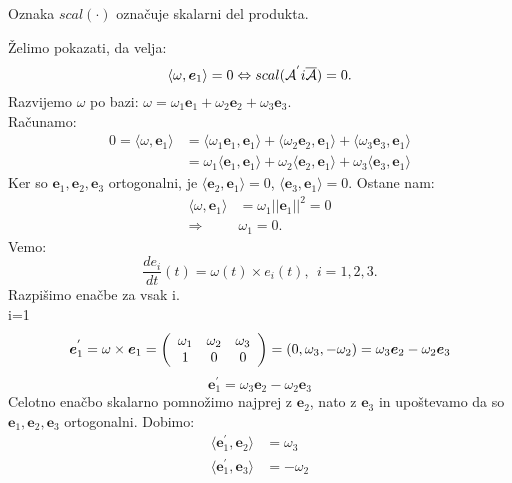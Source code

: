 \documentclass[mat1]{fmfdelo}
\newcommand{\e}{\boldsymbol e}
\newcommand{\A}{\mathcal A}
\begin{document}
\begin{opomba}
	Oznaka $scal(\cdot)$ označuje skalarni del produkta.
\end{opomba}
\begin{dokaz}
Želimo pokazati, da velja:
\begin{equation}
\langle \omega,\e_1\rangle = 0 \Leftrightarrow scal(\A^{'} \\i\overline{\A}) = 0.
\end{equation}
Razvijemo $\omega$ po bazi: $\omega = \omega_1\e_1+\omega_2\e_2+\omega_3\e_3$. \\
Računamo:
\begin{equation*}
\begin{split}
0 = \langle \omega, \e_1 \rangle &= \langle \omega_1\e_1,\e_1\rangle + \langle \omega_2\e_2,\e_1\rangle + \langle \omega_3\e_3,\e_1\rangle \\
&= \omega_1\langle \e_1,\e_1\rangle + \omega_2\langle \e_2,\e_1\rangle + \omega_3\langle \e_3,\e_1\rangle
\end{split}
\end{equation*}
Ker so $\e_1,\e_2,\e_3$ ortogonalni, je  $\langle \e_2,\e_1\rangle = 0$, $\langle \e_3,\e_1\rangle=0$.
Ostane nam:
\begin{equation*}
\begin{split}
\langle \omega,\e_1 \rangle &=\omega_1 || \e_1 ||^2 = 0 \\
\Rightarrow ~~ & \omega_1 = 0.
\end{split}
\end{equation*}
Vemo:
\begin{equation*}
\frac{de_i}{dt}(t) = \omega(t) \times e_i(t), ~~ i=1,2,3.
\end{equation*}
Razpišimo enačbe za vsak i.\\
i=1
\begin{equation*}
\e_1^{'} = \omega \times \e_1 = \left(
\begin{array}{c c c}
\omega_1 & \omega_2 & \omega_3 \\
1 & 0 & 0
\end{array} \right)
= (0, \omega_3,-\omega_2) = \omega_3\e_2 - \omega_2\e_3
\end{equation*}
\begin{equation*}
\e_1^{'} = \omega_3\e_2-\omega_2\e_3
\end{equation*}
Celotno enačbo skalarno pomnožimo najprej z $\e_2$, nato z $\e_3$ in upoštevamo da so $\e_1,\e_2,\e_3$ ortogonalni. Dobimo:
\begin{equation*}
\begin{split}
\langle \e_1^{'}, \e_2 \rangle & = \omega_3 \\
\langle \e_1^{'}, \e_3 \rangle &= -\omega_2
\end{split}
\end{equation*}


\end{dokaz}
\end{document}
